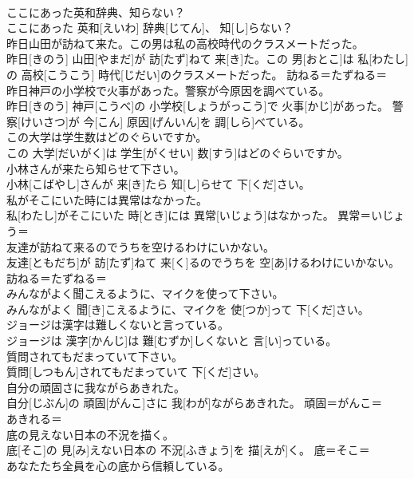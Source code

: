 \documentclass[8pt]{extreport}
\begin{document}
\begin{CJK}{UTF8}{min}
\\	ここにあった英和辞典、知らない？	
\\	ここにあった 英和[えいわ] 辞典[じてん]、 知[し]らない？	
\\	昨日山田が訪ねて来た。この男は私の高校時代のクラスメートだった。	
\\	昨日[きのう] 山田[やまだ]が 訪[たず]ねて 来[き]た。この 男[おとこ]は 私[わたし]の 高校[こうこう] 時代[じだい]のクラスメートだった。	訪ねる＝たずねる＝ 
\\	昨日神戸の小学校で火事があった。警察が今原因を調べている。	
\\	昨日[きのう] 神戸[こうべ]の 小学校[しょうがっこう]で 火事[かじ]があった。 警察[けいさつ]が 今[こん] 原因[げんいん]を 調[しら]べている。	
\\	この大学は学生数はどのぐらいですか。	
\\	この 大学[だいがく]は 学生[がくせい] 数[すう]はどのぐらいですか。	
\\	小林さんが来たら知らせて下さい。	
\\	小林[こばやし]さんが 来[き]たら 知[し]らせて 下[くだ]さい。	
\\	私がそこにいた時には異常はなかった。	
\\	私[わたし]がそこにいた 時[とき]には 異常[いじょう]はなかった。	異常＝いじょう＝ 
\\	友達が訪ねて来るのでうちを空けるわけにいかない。	
\\	友達[ともだち]が 訪[たず]ねて 来[く]るのでうちを 空[あ]けるわけにいかない。	訪ねる＝たずねる＝ 
\\	みんながよく聞こえるように、マイクを使って下さい。	
\\	みんながよく 聞[き]こえるように、マイクを 使[つか]って 下[くだ]さい。	
\\	ジョージは漢字は難しくないと言っている。	
\\	ジョージは 漢字[かんじ]は 難[むずか]しくないと 言[い]っている。	
\\	質問されてもだまっていて下さい。	
\\	質問[しつもん]されてもだまっていて 下[くだ]さい。	
\\	自分の頑固さに我ながらあきれた。	
\\	自分[じぶん]の 頑固[がんこ]さに 我[わが]ながらあきれた。	頑固＝がんこ＝ 
\\	あきれる＝ 
\\	底の見えない日本の不況を描く。	
\\	底[そこ]の 見[み]えない日本の 不況[ふきょう]を 描[えが]く。	底＝そこ＝ 
\\	あなたたち全員を心の底から信頼している。	

\end{CJK}
\end{document}
